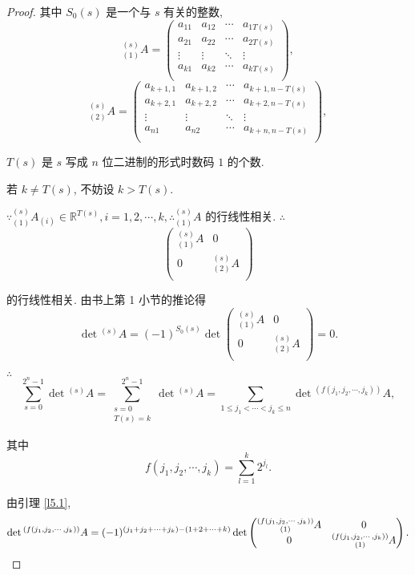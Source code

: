 \documentclass[color=black,device=normal,lang=cn,mode=geye]{elegantnote}
\begin{document}
\begin{proof}
    其中 $S_0(s)$ 是一个与 $s$ 有关的整数,
    \[{}_{(1)}^{(s)}A=\begin{pmatrix}
        a_{11} & a_{12} & \cdots & a_{1T(s)} \\
        a_{21} & a_{22} & \cdots & a_{2T(s)} \\
        \vdots & \vdots & \ddots & \vdots \\
        a_{k1} & a_{k2} & \cdots & a_{kT(s)} \\
    \end{pmatrix},\]
    \[{}_{(2)}^{(s)}A=\begin{pmatrix}
        a_{k+1,1} & a_{k+1,2} & \cdots & a_{k+1,n-T(s)} \\
        a_{k+2,1} & a_{k+2,2} & \cdots & a_{k+2,n-T(s)} \\
        \vdots & \vdots & \ddots & \vdots \\
        a_{n1} & a_{n2} & \cdots & a_{k+n,n-T(s)} \\
    \end{pmatrix},\]

    $T(s)$ 是 $s$ 写成 $n$ 位二进制的形式时数码 $1$ 的个数.

    若 $k\neq T(s)$, 不妨设 $k>T(s)$.

    $\because{}_{(1)}^{(s)}A_{(i)}\in\mathbb{R}^{T(s)},i=1,2,\cdots,k,\therefore{}_{(1)}^{(s)}A$ 的行线性相关. $\therefore$
    \[\begin{pmatrix}
        {}_{(1)}^{(s)}A & 0 \\
        0 & {}_{(2)}^{(s)}A \\
    \end{pmatrix}\]

    的行线性相关. 由书上第 1 小节的推论得
    \[\det{}^{(s)}A=(-1)^{S_0(s)}\det\begin{pmatrix}
        {}_{(1)}^{(s)}A & 0 \\
        0 & {}_{(2)}^{(s)}A \\
    \end{pmatrix}=0.\]

    $\therefore$
    \[\sum\limits_{s=0}^{2^n-1}\det{}^{(s)}A=\sum\limits_{\substack{s=0\\T(s)=k}}^{2^n-1}\det{}^{(s)}A=\sum\limits_{1\leq j_1<\cdots<j_k\leq n}\det{}^{(f(j_1,j_2,\cdots,j_k))}A,\]

    其中
    \[f(j_1,j_2,\cdots,j_k)=\sum\limits_{l=1}^k2^{j_l}.\]

    由引理 \ref{l5.1},
    \[\det{}^{(f(j_1,j_2,\cdots,j_k))}A=(-1)^{(j_1+j_2+\cdots+j_k)-(1+2+\cdots+k)}\det\begin{pmatrix}
        \begin{subarray}{c}
            (f(j_1,j_2,\cdots,j_k)) \\
            (1)
        \end{subarray}A & 0 \\
        0 & \begin{subarray}{c}
                (f(j_1,j_2,\cdots,j_k)) \\
                (1)
            \end{subarray}A \\
    \end{pmatrix}.\]


\end{proof}
\end{document}
